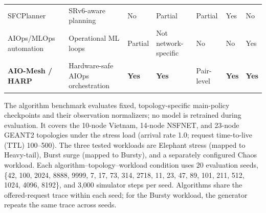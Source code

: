 \documentclass[final,5p]{elsarticle}
\newcommand{\rev}[1]{\textcolor{revisiongreen}{#1}}
\let\newrev\rev
\begin{document}
\begin{table}[t]
{\begin{tabular}{p{4.0cm}p{3.1cm}p{2.0cm}p{2.0cm}p{2.0cm}p{1.8cm}p{1.8cm}}
SFCPlanner~\cite{qiu2024sfcplanner} & SRv6-aware planning & No & Partial & Partial & Yes & No \\
AIOps/MLOps automation~\cite{kreuzberger2023mlops,diazdearcaya2024joint,eken2025mlops,bayram2025trustworthy,zhang2025aiopsllm,eramo2024architecture} & Operational ML loops & Partial & Not network-specific & No & No & Yes \\
\textbf{AIO-Mesh / HARP} & Hardware-safe AIOps orchestration & \textbf{Yes} & \textbf{Yes} & \rev{Pair-level} & \textbf{Yes} & \textbf{Yes} \\
\bottomrule
\end{tabular}
}
\end{table}

\newrev{The algorithm benchmark evaluates fixed, topology-specific main-policy checkpoints and their observation normalizers; no model is retrained during evaluation. It covers the 10-node Vietnam, 14-node NSFNET, and 23-node GEANT2 topologies under the stress load (arrival rate 1.0; request time-to-live (TTL) 100--500). The three tested workloads are Elephant stress (mapped to Heavy-tail), Burst surge (mapped to Bursty), and a separately configured Chaos workload. Each algorithm--topology--workload condition uses 20 evaluation seeds, \{42, 100, 2024, 8888, 9999, 7, 17, 73, 314, 2718, 11, 23, 47, 89, 101, 211, 512, 1024, 4096, 8192\}, and 3,000 simulator steps per seed. Algorithms share the offered-request trace within each seed; for the Bursty workload, the generator repeats the same trace across seeds.}
\end{document}

